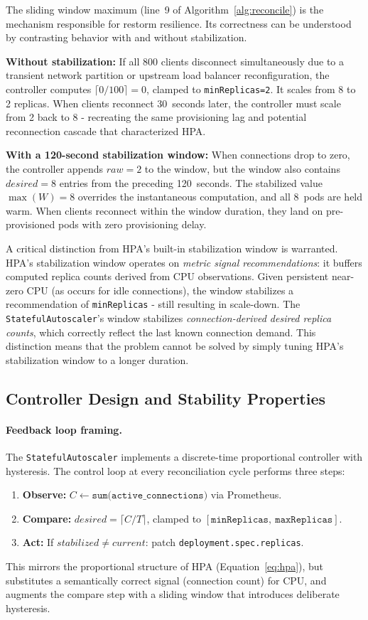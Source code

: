\documentclass[twocolumn]{svjour3}
\begin{document}
The sliding window maximum (line~9 of Algorithm~\ref{alg:reconcile}) is the mechanism responsible for restorm resilience. Its correctness can be understood by contrasting behavior with and without stabilization.

\textbf{Without stabilization:} If all 800 clients disconnect simultaneously due to a transient network partition or upstream load balancer reconfiguration, the controller computes $\lceil 0/100 \rceil = 0$, clamped to \texttt{minReplicas=2}. It scales from 8 to 2 replicas. When clients reconnect 30~seconds later, the controller must scale from 2 back to 8 - recreating the same provisioning lag and potential reconnection cascade that characterized HPA.

\textbf{With a 120-second stabilization window:} When connections drop to zero, the controller appends $raw=2$ to the window, but the window also contains $desired=8$ entries from the preceding 120~seconds. The stabilized value $\max(W)=8$ overrides the instantaneous computation, and all 8~pods are held warm. When clients reconnect within the window duration, they land on pre-provisioned pods with zero provisioning delay.

A critical distinction from HPA's built-in stabilization window is warranted. HPA's stabilization window operates on \textit{metric signal recommendations}: it buffers computed replica counts derived from CPU observations. Given persistent near-zero CPU (as occurs for idle connections), the window stabilizes a recommendation of \texttt{minReplicas} - still resulting in scale-down. The \texttt{StatefulAutoscaler}'s window stabilizes \textit{connection-derived desired replica counts}, which correctly reflect the last known connection demand. This distinction means that the problem cannot be solved by simply tuning HPA's stabilization window to a longer duration.

\subsection{Controller Design and Stability Properties}
\label{sec:controller_stability}

\paragraph{Feedback loop framing.}
The \texttt{StatefulAutoscaler} implements a discrete-time proportional controller with hysteresis. The control loop at every reconciliation cycle performs three steps:
\begin{enumerate}[leftmargin=*]
\item \textbf{Observe:} $C \gets \texttt{sum(active\_connections)}$ via Prometheus.
\item \textbf{Compare:} $desired = \lceil C / T \rceil$, clamped to $[\texttt{minReplicas},\ \texttt{maxReplicas}]$.
\item \textbf{Act:} If $stabilized \neq current$: patch \texttt{deployment.spec.replicas}.
\end{enumerate}
This mirrors the proportional structure of HPA (Equation~\ref{eq:hpa}), but substitutes a semantically correct signal (connection count) for CPU, and augments the compare step with a sliding window that introduces deliberate hysteresis.
\end{document}
